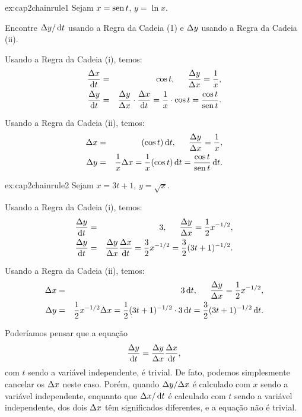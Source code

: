 \begin{examplecont}{ex:cap2chainrule1}
Sejam \hspace{1.5em} $x = \operatorname{sen} t$, \hspace{1.5em} $y = \ln x$.

Encontre $\dy/\dt$ usando a Regra da Cadeia (1) e $\Delta{y}$ usando a Regra
da Cadeia (ii).

Usando a Regra da Cadeia (i), temos:
\begin{eqnarray*}
  \frac{\dx}{\dt} & = & \cos t, \hspace{1.5em} \frac{\dy}{\dx} = \frac{1}{x},\\
  \frac{\dy}{\dt} & = & \frac{\dy}{\dx} \cdot \frac{\dx}{\dt} =
    \frac{1}{x} \cdot \cos t = \frac{\cos t}{\sen t}.
\end{eqnarray*}

Usando a Regra da Cadeia (ii), temos:
\begin{eqnarray*}
  \dx & = & (\cos t) \dt, \hspace{1.5em} \frac{\dy}{\dx} = \frac{1}{x},\\
  \dy & = & \frac{1}{x} \dx = \frac{1}{x}(\cos t)\dt = \frac{\cos t}{\sen t} \dt.
\end{eqnarray*}
\end{examplecont}

\begin{examplecont}{ex:cap2chainrule2}
Sejam \hspace{1.5em} $x = 3t + 1$, \hspace{1.5em} $y = \sqrt{x}$.

Usando a Regra da Cadeia (i), temos:
\begin{eqnarray*}
  \frac{\dy}{\dt} &=& 3, \hspace{1.5em} \frac{\dy}{\dx} = \frac{1}{2}x^{-1/2},\\
  \frac{\dy}{\dt} &=& \frac{\dy}{\dx}\frac{\dx}{\dt} = \frac{3}{2}x^{-1/2} =
    \frac{3}{2}(3t+1)^{-1/2}.
\end{eqnarray*}

Usando a Regra da Cadeia (ii), temos:
\begin{eqnarray*}
  \dx & = & 3 \dt, \hspace{1.5em} \frac{\dy}{\dx} = \frac{1}{2}x^{-1/2}, \\
  \dy & = & \frac{1}{2}x^{-1/2} \dx = \frac{1}{2}(3t+1)^{-1/2} \cdot 3 \dt
    = \frac{3}{2}(3t+1)^{-1/2} \dt.
\end{eqnarray*}
\end{examplecont}

Poderíamos pensar que a equação
$$
  \frac{\dy}{\dt} = \frac{\dy}{\dx} \frac{\dx}{\dt},
$$
com $t$ sendo a variável independente, é trivial. De fato, podemos
simplesmente cancelar os $\Delta{x}$ neste caso. Porém, quando $\Delta{y}/\Delta{x}$
é calculado com $x$ sendo a variável independente, enquanto que $\dx/\dt$
é calculado com $t$ sendo a variável independente, dos dois $\Delta{x}$ têm
significados diferentes, e a equação não é trivial.

